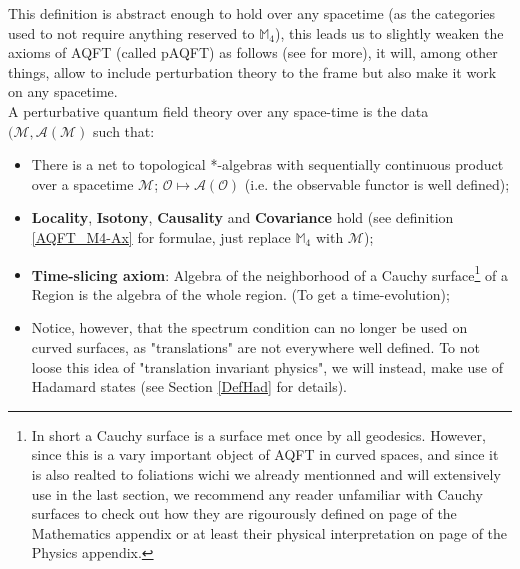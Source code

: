 \documentclass[a4paper,11pt]{article}
\numberwithin{equation}{section}
\theoremstyle{definition}
\begin{document}
This definition is abstract enough to hold over any spacetime (as the categories used to not require anything reserved to $\mathbb{M}_4$), this leads us to slightly weaken the axioms of AQFT (called pAQFT) as follows (see \cite{pAQFT} for more), it will, among other things, allow to include perturbation theory to the frame but also make it work on any spacetime.\\
A perturbative quantum field theory over any space-time is the data $(\mathcal{M},\mathcal{A}(\mathcal{M})$ such that:
\begin{itemize}
    \item There is a net to topological *-algebras with sequentially continuous product over a spacetime $\mathcal{M}$; $\mathcal{O}\mapsto\mathcal{A}(\mathcal{O})$ (i.e. the observable functor is well defined);
    \item \textbf{Locality}, \textbf{Isotony}, \textbf{Causality} and \textbf{Covariance} hold (see definition \ref{AQFT_M4-Ax} for formulae, just replace $\mathbb{M}_4$ with $\mathcal{M}$);
    \item \textbf{Time-slicing axiom}: Algebra of the neighborhood of a Cauchy surface\footnote{In short a Cauchy surface is a surface met once by all geodesics. However, since this is a vary important object of AQFT in curved spaces, and since it is also realted to foliations wichi we already mentionned and will extensively use in the last section, we recommend any reader unfamiliar with Cauchy surfaces to check out how they are rigourously defined on page \pageref{CauchyMat} of the Mathematics appendix or at least their physical interpretation on page \pageref{CauchyPhy} of the Physics appendix.} of a Region is the algebra of the whole region. (To get a time-evolution);
    \item Notice, however, that the spectrum condition can no longer be used on curved surfaces, as "translations" are not everywhere well defined. To not loose this idea of "translation invariant physics", we will instead, make use of Hadamard states \label{FirstMentionHad}(see Section \ref{DefHad} for details).
\end{itemize}
\end{document}
